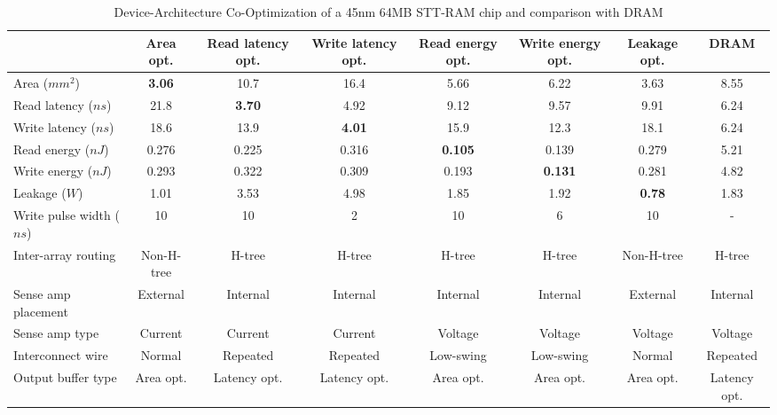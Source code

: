 \begin{table}[t]
\centering
\caption{Device-Architecture Co-Optimization of a 45nm 64MB STT-RAM chip and comparison with DRAM}
\label{tb:bigtable}
\begin{tabular}{| l | c | c | c | c | c | c | c |}
\hline\hline
& Area opt. & Read latency opt. & Write latency opt. & Read energy opt. & Write energy opt. & Leakage opt. &  DRAM \\
\hline
Area ($mm^2$) & \textbf{3.06} & 10.7 & 16.4 & 5.66 & 6.22 & 3.63 & 8.55\\
\hline
Read latency ($ns$) & 21.8 & \textbf{3.70} & 4.92 & 9.12 & 9.57 & 9.91 & 6.24\\
\hline
Write latency ($ns$) & 18.6	& 13.9	& \textbf{4.01}	& 15.9	& 12.3	& 18.1 & 6.24\\
\hline
Read energy ($nJ$) & 0.276	& 0.225	& 0.316	& \textbf{0.105}	& 0.139	& 0.279 & 5.21\\
\hline
Write energy ($nJ$) & 0.293	& 0.322	& 0.309	& 0.193	& \textbf{0.131}	& 0.281 & 4.82\\
\hline
Leakage ($W$) & 1.01	& 3.53	& 4.98	& 1.85	& 1.92	& \textbf{0.78} & 1.83\\
\hline\hline
Write pulse width ($ns$) & 10 & 10 & 2 & 10 & 6 & 10 & - \\
\hline
Inter-array routing & Non-H-tree & H-tree & H-tree & H-tree & H-tree & Non-H-tree & H-tree \\
\hline
Sense amp placement & External & Internal & Internal & Internal & Internal & External & Internal \\
\hline
Sense amp type & Current & Current & Current & Voltage & Voltage & Voltage & Voltage \\
\hline
Interconnect wire & Normal & Repeated & Repeated & Low-swing & Low-swing & Normal & Repeated \\
\hline
Output buffer type & Area opt. & Latency opt. & Latency opt. & Area opt. & Area opt. & Area opt. & Latency opt. \\
\hline\hline
\end{tabular}
\end{table}

